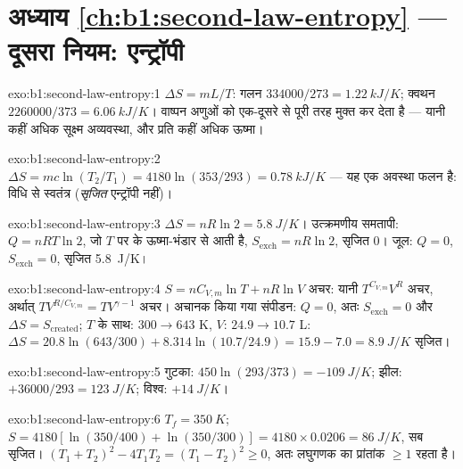 \section*{अध्याय \ref{ch:b1:second-law-entropy} --- दूसरा नियम: एन्ट्रॉपी}

\begin{solution}{exo:b1:second-law-entropy:1}
$\Delta S = mL/T$: गलन $334000/273 = \qty{1.22}{kJ/K}$; क्वथन $2260000/
373 = \qty{6.06}{kJ/K}$। वाष्पन अणुओं को एक-दूसरे से पूरी तरह मुक्त कर देता
है --- यानी कहीं अधिक सूक्ष्म अव्यवस्था, और प्रति  कहीं अधिक ऊष्मा।
\end{solution}

\begin{solution}{exo:b1:second-law-entropy:2}
$\Delta S = mc\ln(T_2/T_1) = 4180\ln(353/293) = \qty{0.78}{kJ/K}$ --- यह एक
अवस्था फलन है: विधि से स्वतंत्र (\emph{सृजित} एन्ट्रॉपी नहीं)।
\end{solution}

\begin{solution}{exo:b1:second-law-entropy:3}
$\Delta S = nR\ln2 = \qty{5.8}{J/K}$। उत्क्रमणीय समतापी: $Q = nRT\ln2$, जो
$T$ पर के ऊष्मा-भंडार से आती है, $S_{\mathrm{exch}} = nR\ln2$, सृजित $0$। जूल:
$Q = 0$, $S_{\mathrm{exch}} = 0$, सृजित \qty{5.8}{J/K}।
\end{solution}

\begin{solution}{exo:b1:second-law-entropy:4}
$S = nC_{V,m}\ln T + nR\ln V$ अचर: यानी $T^{C_{V,m}}V^R$ अचर, अर्थात्
$TV^{R/C_{V,m}} = TV^{\gamma - 1}$ अचर। अचानक किया गया संपीडन: $Q = 0$, अतः
$S_{\mathrm{exch}} = 0$ और $\Delta S = S_{\mathrm{created}}$; $T$ के साथ: $300 \to
643$ K, $V$: $24.9 \to 10.7$ L: $\Delta S = 20.8\ln(643/300) + 8.314\ln(10.7/
24.9) = 15.9 - 7.0 = \qty{+8.9}{J/K}$ सृजित।
\end{solution}

\begin{solution}{exo:b1:second-law-entropy:5}
गुटका: $450\ln(293/373) = \qty{-109}{J/K}$; झील: $+36000/293 = \qty{+123}{J/K}$;
विश्व: $+\qty{14}{J/K}$।
\end{solution}

\begin{solution}{exo:b1:second-law-entropy:6}
$T_f = \qty{350}{K}$; $S = 4180[\ln(350/400) + \ln(350/300)] = 4180 \times
0.0206 = \qty{86}{J/K}$, सब सृजित। $(T_1 + T_2)^2 - 4T_1T_2 = (T_1 - T_2)^2
\geq 0$, अतः लघुगणक का प्रांतांक $\geq 1$ रहता है।
\end{solution}

